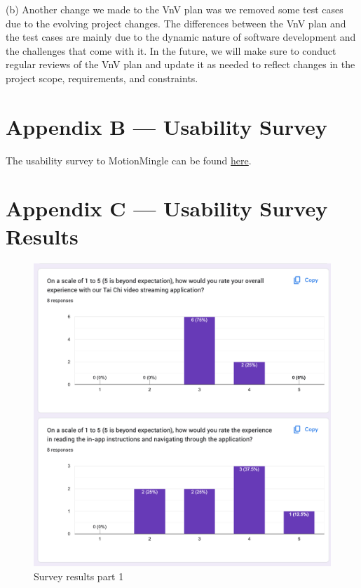 \documentclass[12pt, titlepage]{article}
\begin{document}
(b) Another change we made to the VnV plan was we removed some test cases due to
the evolving project changes. The differences between the VnV plan and the test
cases are mainly due to the dynamic nature of software development and the
challenges that come with it. In the future, we will make sure to conduct
regular reviews of the VnV plan and update it as needed to reflect changes in
the project scope, requirements, and constraints.

\section*{Appendix B --- Usability Survey}
The usability survey to MotionMingle can be found \href{https://docs.google.com/forms/d/e/1FAIpQLSchSdc_kHr98yHP8QPyWItHoP-dj_hJnuEtNByH0V2M_iDjWw/viewform}{here}.

\section*{Appendix C --- Usability Survey Results}
\begin{figure}[h]
  \centering
  \includegraphics[width=1.0\linewidth]{surveyp1.png}
  \caption{Survey results part 1}
  \label{fig:surveyp1}
\end{figure}
\end{document}
